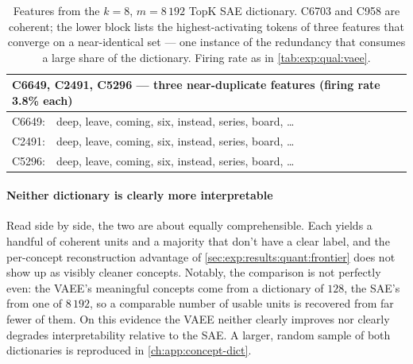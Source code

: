 \begin{table}[tb]
\begin{tabularx}{\linewidth}{@{}>{\ttfamily}X@{}}
        \addlinespace
        {\normalfont\textbf{C6649}, \textbf{C2491}, \textbf{C5296} --- three near-duplicate features \hfill (firing rate 3.8\% each)}\\
        \cmidrule(){1-1}
        C6649:\ \ deep, leave, coming, six, instead, series, board, \dots\\
        C2491:\ \ deep, leave, coming, six, instead, series, board, \dots\\
        C5296:\ \ deep, leave, coming, six, instead, series, board, \dots\\
        \bottomrule
    \end{tabularx}
    \caption[\acs{SAE} concept dictionary]{
        Features from the $k = 8$, $m = 8\,192$ TopK \ac{SAE} dictionary. C6703
        and C958 are coherent; the lower block lists the highest-activating
        tokens of three features that converge on a near-identical set --- one
        instance of the redundancy that consumes a large share of the
        dictionary. Firing rate as in \cref{tab:exp:qual:vaee}.
    }
    \label{tab:exp:qual:sae}
\end{table}

\paragraph{Neither dictionary is clearly more interpretable} Read side by side,
the two are about equally comprehensible. Each yields a handful of coherent
units and a majority that don't have a clear label, and the per-concept
reconstruction advantage of \cref{sec:exp:results:quant:frontier}
does not show up as visibly cleaner concepts. Notably, the comparison is not
perfectly even: the \ac{VAEE}'s meaningful concepts come from a dictionary of
$128$, the \ac{SAE}'s from one of $8\,192$, so a comparable number of usable
units is recovered from far fewer of them. On this evidence the \ac{VAEE}
neither clearly improves nor clearly degrades interpretability relative to the
\ac{SAE}. A larger, random sample of both dictionaries is reproduced in
\cref{ch:app:concept-dict}.

